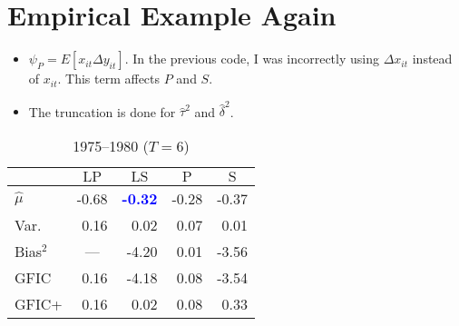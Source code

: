 \documentclass[11pt]{article}
\begin{document}



\doublespacing



\section*{Empirical Example Again}

\begin{itemize}
\item $\psi_P = E[x_{it} \Delta y_{it}]$. In the previous code, I was incorrectly using $\Delta x_{it}$ instead of $x_{it}$. This term affects $P$ and $S$. 
\item The truncation is done for $\widehat{\tau}^2$ and $\widehat{\delta}^2$.\\
\end{itemize}

\begin{table}[htbp]
       \centering
     \caption{1975--1980 ($T=6$)}
     \begin{tabular}{lrrrr}\hline\hline 
         & \multicolumn{1}{c}{$\text{LP}$} & \multicolumn{1}{c}{$\text{LS}$} 
          & \multicolumn{1}{c}{$\text{P}$} & \multicolumn{1}{c}{$\text{S}$}\\
        \hline
        $\widehat{\mu}$ & -0.68 & \textcolor{blue}{\textbf{-0.32}} &  -0.28 &  -0.37\\
        Var.\ & 0.16 &  0.02 & 0.07 & 0.01\\ 
        Bias$^2$ & \multicolumn{1}{c}{---} & -4.20 & 0.01 & -3.56 \\
        GFIC  & 0.16 & -4.18 & 0.08  & -3.54  \\
        GFIC+  & 0.16 &  0.02 & 0.08  & 0.33    \\
        \hline
      \end{tabular}
 \end{table}
\end{document}
